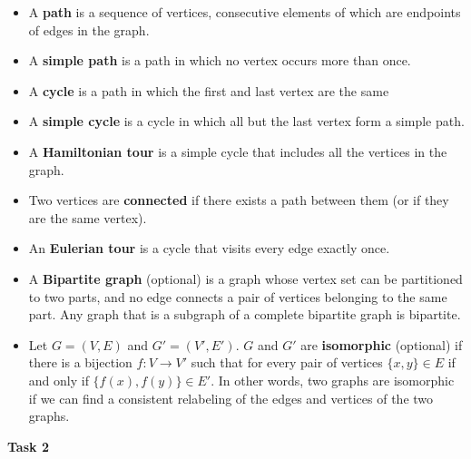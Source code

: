 \documentclass[12pt,letterpaper]{article}
\begin{document}
\begin{itemize}
    \item A \textbf{path} is a sequence of vertices, consecutive elements of which are endpoints of edges in the graph.
    \item A \textbf{simple path} is a path in which no vertex occurs more than once.
    \item A \textbf{cycle} is a path in which the first and last vertex are the same
    \item A \textbf{simple cycle} is a cycle in which all but the last vertex form a simple path.
    \item A \textbf{Hamiltonian tour} is a simple cycle that includes all the vertices in the graph.
    \item Two vertices are \textbf{connected} if there exists a path between them (or if they are the same vertex).
    \item An \textbf{Eulerian tour} is a cycle that visits every edge exactly once.
    \item A \textbf{Bipartite graph} (optional) is a graph whose vertex set can be partitioned to two parts, and no edge connects a pair of vertices belonging to the same part. Any graph that is a subgraph  of a complete bipartite graph is bipartite. 
    \item Let $G=(V, E)$ and $G'=(V', E')$. $G$ and $G'$ are \textbf{isomorphic} (optional) if there is a bijection $f: V \longrightarrow V'$ such that for every pair of vertices $\{x, y\} \in E$ if and only if $\{f(x), f(y)\} \in E'$. In other words, two graphs are isomorphic if we can find a consistent relabeling of the edges and vertices of the two graphs.

\end{itemize}
\newpage
\textbf{Task 2}
\end{document}
